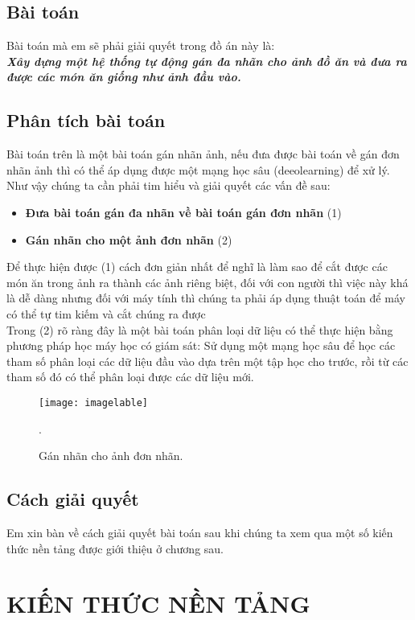 \documentclass[13pt, a4paper]{extreport}
\begin{document}
\section{Bài toán}
\indent Bài toán mà em sẽ phải giải quyết trong đồ án này là:\\
\indent \textbf{\textit{Xây dựng một hệ thống tự động gán đa nhãn cho ảnh đồ ăn và đưa ra được các món ăn giống như ảnh đầu vào.}}
\newpage
\section{Phân tích bài toán}
\indent Bài toán trên là một bài toán gán nhãn ảnh, nếu đưa được bài toán về gán đơn nhãn ảnh thì có thể áp dụng được một mạng học sâu (deeolearning) để xử lý. Như vậy chúng ta cần phải tim hiểu và giải quyết các vấn đề sau:
\begin{itemize}
	\item \textbf{Đưa bài toán gán đa nhãn về bài toán gán đơn nhãn} (1)
	\item \textbf{Gán nhãn cho một ảnh đơn nhãn} (2)
\end{itemize}

\indent Để thực hiện được (1) cách đơn giản nhất để nghĩ là làm sao để cắt được các món ăn trong ảnh ra thành các ảnh riêng biệt, đối với con người thì việc này khá là dễ dàng nhưng đối với máy tính thì chúng ta phải áp dụng thuật toán để máy có thể tự tim kiếm và cắt chúng ra được \\
\indent Trong (2) rõ ràng đây là một bài toán phân loại dữ liệu có thể thực hiện bằng phương pháp học máy học có giám sát: Sử dụng một mạng học sâu để học các tham số phân loại các dữ liệu đầu vào dựa trên một tập học cho trước, rồi từ các tham số đó có thể phân loại được các dữ liệu mới.
\begin{figure}[H]
  \centering
    \texttt{[image: imagelable]}
    \caption{\large Gán nhãn cho ảnh đơn nhãn.}.
\end{figure}
\section{Cách giải quyết}
\indent Em xin bàn về cách giải quyết bài toán sau khi chúng ta xem qua một số kiến thức nền tảng được giới thiệu ở chương sau.
\chapter{KIẾN THỨC NỀN TẢNG}
\end{document}
